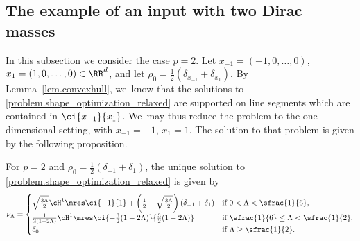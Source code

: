 \subsection{The example of an input with two Dirac masses}
In this subsection we consider the case $p=2$. Let $x_{-1}=(-1,0,\ldots, 0)$, $x_{1}=(1,0,\ldots,0) \in \RR^d$, and let $\rho_0=\frac{1}{2}\left(\delta_{x_{-1}}+\delta_{x_{1}}\right)$. By Lemma~\ref{lem.convexhull}, we~know that the solutions to \eqref{problem.shape_optimization_relaxed} are supported on line segments which are contained in $\ci{x_{-1}}{x_1}$. We~may thus reduce the problem to the one-dimensional setting, with $x_{-1}=-1$, $x_{1}=1$. The solution to that problem is given by the following proposition.

\begin{proposition}
For $p=2$ and $\rho_0=\frac{1}{2}\left(\delta_{-1}+\delta_{1}\right)$, the unique solution to \eqref{problem.shape_optimization_relaxed} is given by
\begin{align}
\nu_\Lambda = \begin{cases}
\sqrt{\frac{3\Lambda}{2}}\cH^1\mres\ci{-1}{1} + \left(\frac{1}{2}-\sqrt{\frac{3\Lambda}{2}}\right)(\delta_{-1}+\delta_1) & \mbox{if $0<\Lambda<\sfrac{1}{6}$},\\
\frac{1}{3(1-2\Lambda)}\cH^1\mres\ci{-\frac{3}{2}(1-2\Lambda)}{\frac{3}{2}(1-2\Lambda)} &\mbox{if $\sfrac{1}{6}\le \Lambda <\sfrac{1}{2}$},\\
\delta_0 & \mbox{if $\Lambda\geq \sfrac{1}{2}$}.
\end{cases} \label{eq:}
\end{align}
\end{proposition}


